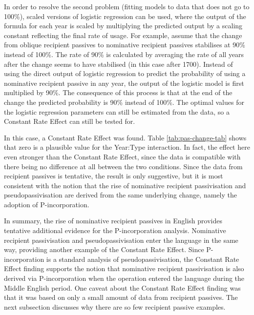 	In order to resolve the second problem (fitting models to data that does not go to 100\%), scaled versions of logistic regression can be used, where the output of the formula for each year is scaled by multiplying the predicted output by a scaling constant reflecting the final rate of usage. For example, assume that the change from oblique recipient passives to nominative recipient passives stabilises at 90\% instead of 100\%. The rate of 90\% is calculated by averaging the rate of all years after the change seems to have stabilised (in this case after 1700). Instead of using the direct output of logistic regression to predict the probability of using a nominative recipient passive in any year, the output of the logistic model is first multiplied by 90\%. The consequence of this process is that at the end of the change the predicted probability is 90\% instead of 100\%. The optimal values for the logistic regression parameters can still be estimated from the data, so a Constant Rate Effect can still be tested for. 

	In this case, a Constant Rate Effect was found. Table \ref{tab:pas-change-tab} shows that zero is a plausible value for the Year:Type interaction. In fact, the effect here even stronger than the Constant Rate Effect, since the data is compatible with there being no difference at all between the two conditions. Since the data from recipient passives is tentative, the result is only suggestive, but it is most consistent with the notion that the rise of nominative recipient passivisation and pseudopassivisation are derived from the same underlying change, namely the adoption of P-incorporation.



	In summary, the rise of nominative recipient passives in English provides tentative additional evidence for the P-incorporation analysis. Nominative recipient passivisation and pseudopassivisation enter the language in the same way, providing another example of the Constant Rate Effect. Since P-incorporation is a standard analysis of pseudopassivisation, the Constant Rate Effect finding supports the notion that nominative recipient passivisation is also derived via P-incorporation when the operation entered the language during the Middle English period. One caveat about the Constant Rate Effect finding was that it was based on only a small amount of data from recipient passives. The next subsection discusses why there are so few recipient passive examples.

